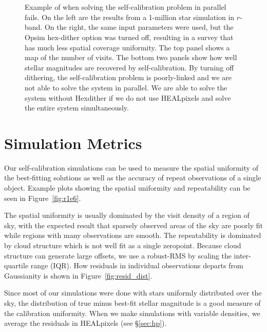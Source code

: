 \documentclass[12pt,preprint]{aastex}
\begin{document}
\begin{figure}
\\
\\
\caption{Example of when solving the self-calibration problem in parallel fails.  On the left are the results from a 1-million star simulation in $r$-band.  On the right, the same input parameters were used, but the Opsim hex-dither option was turned off, resulting in a survey that has much less spatial coverage uniformity.  The top panel shows a map of the number of visits.  The bottom two panels show how well stellar magnitudes are recovered by self-calibration.  By turning off dithering, the self-calibration problem is poorly-linked and we are not able to solve the system in parallel.  We are able to solve the system without Hexdither if we do not use HEALpixels and solve the entire system simultaneously.  \label{fig:nodither}}
\end{figure}




\section{Simulation Metrics}

Our self-calibration simulations can be used to measure the spatial uniformity of the best-fitting solutions as well as the accuracy of repeat observations of a single object.  Example plots showing the spatial uniformity and repeatability can be seen in Figure~\ref{fig:r1e6}.  

The spatial uniformity is usually dominated by the visit density of a region of sky, with the expected result that sparsely observed areas of the sky are poorly fit while regions with many observations are smooth.  The repeatability is dominated by cloud structure which is not well fit as a single zeropoint.  Because cloud structure can generate large offsets, we use a robust-RMS by scaling the inter-quartile range (IQR).  How residuals in individual observations departs from Gaussianity is shown in Figure~\ref{fig:resid_dist}.

Since most of our simulations were done with stars uniformly distributed over the sky, the distribution of true minus best-fit stellar magnitude is a good measure of the calibration uniformity.  When we make simulations with variable densities, we average the residuals in HEALpixels (see \S\ref{sec:hp}).
\end{document}
